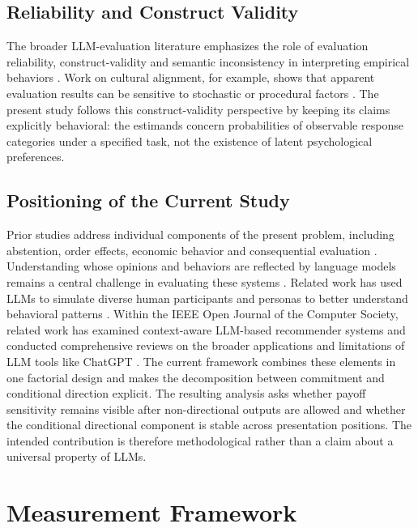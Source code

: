 \documentclass[10pt,journal,compsoc]{IEEEtran}
\begin{document}
\subsection{Reliability and Construct Validity}
The broader LLM-evaluation literature emphasizes the role of evaluation reliability, construct-validity and semantic inconsistency in interpreting empirical behaviors \cite{ojcs_sindex_2026}. Work on cultural alignment, for example, shows that apparent evaluation results can be sensitive to stochastic or procedural factors \cite{randomness_not_rep_2025}.  The present study follows this construct-validity perspective by keeping its claims explicitly behavioral: the estimands concern probabilities of observable response categories under a specified task, not the existence of latent psychological preferences.

\subsection{Positioning of the Current Study}
Prior studies address individual components of the present problem, including abstention, order effects, economic behavior and consequential evaluation \cite{ai_revealed_preferences_2026}. Understanding whose opinions and behaviors are reflected by language models remains a central challenge in evaluating these systems \cite{whos_opinions_lm_2023}. Related work has used LLMs to simulate diverse human participants and personas to better understand behavioral patterns \cite{aher2023turing}. Within the IEEE Open Journal of the Computer Society, related work has examined context-aware LLM-based recommender systems \cite{ojcs_cd_llmcars_2024} and conducted comprehensive reviews on the broader applications and limitations of LLM tools like ChatGPT \cite{ojcs_chatgpt_survey_2023}. The current framework combines these elements in one factorial design and makes the decomposition between commitment and conditional direction explicit. The resulting analysis asks whether payoff sensitivity remains visible after non-directional outputs are allowed and whether the conditional directional component is stable across presentation positions. The intended contribution is therefore methodological rather than a claim about a universal property of LLMs.

\section{Measurement Framework}
\label{sec:framework}
\end{document}
